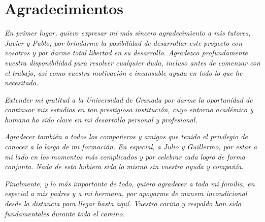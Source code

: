 

\chapter{Agradecimientos}

\emph{En primer lugar, quiero expresar mi más sincero agradecimiento a mis tutores, Javier y Pablo, por brindarme la posibilidad de desarrollar este proyecto con vosotros y por darme total libertad en su desarrollo. Agradezco profundamente vuestra disponibilidad para resolver cualquier duda, incluso antes de comenzar con el trabajo, así como vuestra motivación e incansable ayuda en todo lo que he necesitado.}\newline

\emph{Extender mi gratitud a la Universidad de Granada por darme la oportunidad de continuar mis estudios en tan prestigiosa institución, cuyo entorno académico y humano ha sido clave en mi desarrollo personal y profesional.}\newline

\emph{Agradecer también a todos los compañeros y amigos que tenido el privilegio de conocer a lo largo de mi formación. En especial, a Julio y Guillermo, por estar a mi lado en los momentos más complicados y por celebrar cada logro de forma conjunta. Nada de esto hubiera sido lo mismo sin vuestra ayuda y compañía.}\newline

\emph{Finalmente, y lo más importante de todo, quiero agradecer a toda mi familia, en especial a mis padres y a mi hermana, por apoyarme de manera incondicional desde la distancia para llegar hasta aquí. Vuestro cariño y respaldo han sido fundamentales durante todo el camino.}\newline

\clearpage
\thispagestyle{empty}
\mbox{}
\newpage
\endinput

